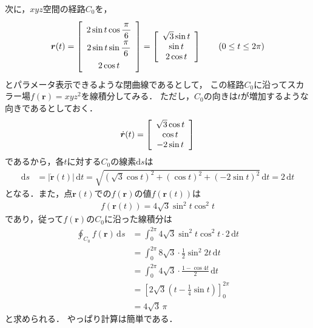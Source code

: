 次に，$xyz$空間の経路$C_0$を，
\begin{align*}
\renewcommand{\arraystretch}{1.7}
\bm{r}(t) = \left[
\begin{array}{c}
2 \sin t  \displaystyle \cos \frac{\pi}{6} \\
2 \sin t \displaystyle \sin \frac{\pi}{6} \\
2 \cos t
\end{array}
\right]
= \left[
\renewcommand{\arraystretch}{1}
\begin{array}{c}
\sqrt{3} \sin t \\
\sin t \\
2 \cos t
\end{array}
\right]
\qquad ( 0 \leq t \leq 2 \pi )  
\end{align*}
とパラメータ表示できるような閉曲線であるとして，
この経路$C_0$に沿ってスカラー場$f(\bm{r}) = xyz^2$を線積分してみる．
ただし，$C_0$の向きは$t$が増加するような向きであるとしておく．
\begin{align*}
\dot{ \bm{r} } (t) = \left[
\renewcommand{\arraystretch}{1}
\begin{array}{c} 
\sqrt{3} \cos t \\
\cos t \\
-2 \sin t
\end{array}
\right]
\end{align*}
であるから，各$t$に対する$C_0$の線素$\mathrm{d}s$は
\begin{align*}
\mathrm{d}s & = \lvert \dot{ \bm{r} } (t) \rvert \, \mathrm{d}t 
= \sqrt{ (\sqrt{3} \cos t)^2 + ( \cos t )^2 + ( -2 \sin t )^2 } \, \mathrm{d}t 
= 2 \, \mathrm{d}t
\end{align*}
となる．また，点$\bm{r}(t)$での$f(\bm{r})$の値$f(\bm{r}(t))$は
\begin{align*}
f(\bm{r} (t) ) = 4 \sqrt{3} \sin^2 t \cos ^2 t 
\end{align*}
であり，従って$f(\bm{r})$の$C_0$に沿った線積分は
\begin{align*}
\oint_{C_0} f ( \bm{r} ) \, \mathrm{d} s 
& = \int _0^{2\pi} 4 \sqrt{3} \sin^2 t \cos ^2 t \cdot 2 \, \mathrm{d}t \\
& = \int _0^{2 \pi} 8 \sqrt{3} \cdot \frac{1}{2} \sin ^2 2t \, \mathrm{d} t \\
& = \int _0 ^{2\pi} 4 \sqrt{3} \cdot \frac{ 1- \cos 4t} {2} \, \mathrm{d} t \\
& = \left[ 2 \sqrt{3} \left( t - \frac{1}{4} \sin t \right) \right]_0^{2\pi} \\
& = 4 \sqrt{3} \, \pi
\end{align*}
と求められる．
やっぱり計算は簡単である．


